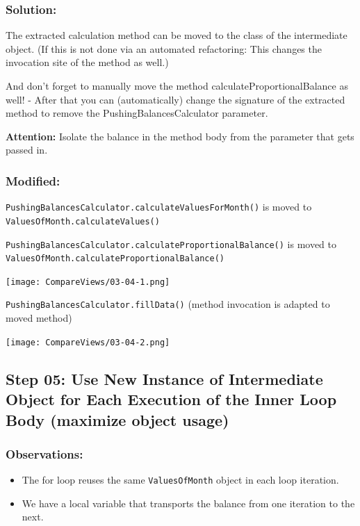 \documentclass[a4paper,fleqn,titlepage,11pt]{article}
\begin{document}
\subsubsection*{Solution:}

The extracted calculation method can be moved to the class of the intermediate object. (If this is not done via an automated refactoring: This changes the invocation site of the method as well.)

And don't forget to manually move the method calculateProportionalBalance as well! - After that you can (automatically) change the signature of the extracted method to remove the PushingBalancesCalculator parameter.

\textbf{Attention:} Isolate the balance in the method body from the parameter that gets passed in.


\subsubsection*{Modified:}

\texttt{PushingBalancesCalculator.calculateValuesForMonth()} is moved to\\ \texttt{ValuesOfMonth.calculateValues()}

\texttt{PushingBalancesCalculator.calculateProportionalBalance()} is moved to\\ \texttt{ValuesOfMonth.calculateProportionalBalance()}

\texttt{[image: CompareViews/03-04-1.png]}

\texttt{PushingBalancesCalculator.fillData()} (method invocation is adapted to moved method)

\texttt{[image: CompareViews/03-04-2.png]}


\subsection*{Step 05: Use New Instance of Intermediate Object for Each Execution of the Inner Loop Body (maximize object usage)}

\subsubsection*{Observations:}
\begin{itemize}
\item The for loop reuses the same \texttt{ValuesOfMonth} object in each loop iteration.
\item We have a local variable that transports the balance from one iteration to the next.
\end{itemize}
\end{document}
